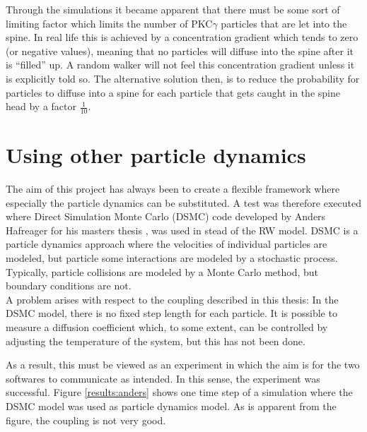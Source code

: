 Through the simulations it became apparent that there must be some sort of limiting factor which limits the number of PKC$\gamma$ particles that are let into the spine. 
In real life this is achieved by a concentration gradient which tends to zero (or negative values), meaning that no particles will diffuse into the spine after it is ``filled'' up. 
A random walker will not feel this concentration gradient unless it is explicitly told so. 
The alternative solution then, is to reduce the probability for particles to diffuse into a spine for each particle that gets caught in the spine head by a factor $\frac{1}{10}$. 

\section{Using other particle dynamics}

The aim of this project has always been to create a flexible framework where especially the particle dynamics can be substituted. 
A test was therefore executed where Direct Simulation Monte Carlo (DSMC) code developed by Anders Hafreager for his masters thesis \cite{hafreager2014flow}, was used in stead of the RW model. 
DSMC is a particle dynamics approach where the velocities of individual particles are modeled, but particle some interactions are modeled by a stochastic process. 
Typically, particle collisions are modeled by a Monte Carlo method, but boundary conditions are not.\\

\noindent A problem arises with respect to the coupling described in this thesis: 
In the DSMC model, there is no fixed step length for each particle. It is possible to measure a diffusion coefficient which, to some extent, can be controlled by adjusting the temperature of the system, but this has not been done. 

As a result, this must be viewed as an experiment in which the aim is for the two softwares to communicate as intended. 
In this sense, the experiment was successful. 
Figure \ref{results:anders} shows one time step of a simulation where the DSMC model was used as particle dynamics model. 
As is apparent from the figure, the coupling is not very good. 


